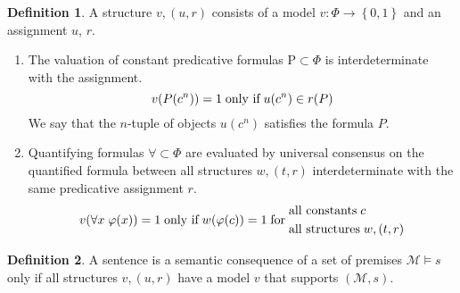 \documentclass{amsbook}
\newcommand{\setsm}[1]{\left\{#1\right\}}
\newcommand{\univ}[1]{\mathord\forall#1\;}
\newcommand{\valids}{\mathrel\vDash}
\theoremstyle{definition}
\newtheorem{dfn}{Definition}[section]
\begin{document}
\begin{dfn}
    A structure $v, (u, r)$ consists of a model $v: \Phi \longrightarrow \setsm{0,1}$ and an assignment $u$, $r$.
    \begin{enumerate}
        \item
              The valuation of constant predicative formulas $\mathrm P \subset \Phi$ is interdeterminate with the assignment.
              $$v(P(c^n)) = 1 \text{\;only if\;} u(c^n) \in r(P)$$
              We say that the $n$-tuple of objects $u(c^n)$ satisfies the formula $P$.
        \item
              Quantifying formulas $\mathord\forall \subset \Phi$ are evaluated by universal consensus on the quantified formula between all structures $w, (t, r)$ interdeterminate with the same predicative assignment $r$.
              $$v(\univ x \varphi(x)) = 1 \text{\;only if\;} w(\varphi(c)) = 1 \text{\;for\;} \begin{aligned}
                       & \text{all constants\;} c \\
                       &
                      \text{all structures\;}
                      w, (t, r)
                  \end{aligned}$$
    \end{enumerate}
\end{dfn}

\begin{dfn}
    A sentence is a semantic consequence of a set of premises $\mathcal M \valids s$ only if all structures $v, (u, r)$ have a model $v$ that supports $(\mathcal M, s)$.
\end{dfn}
\end{document}
